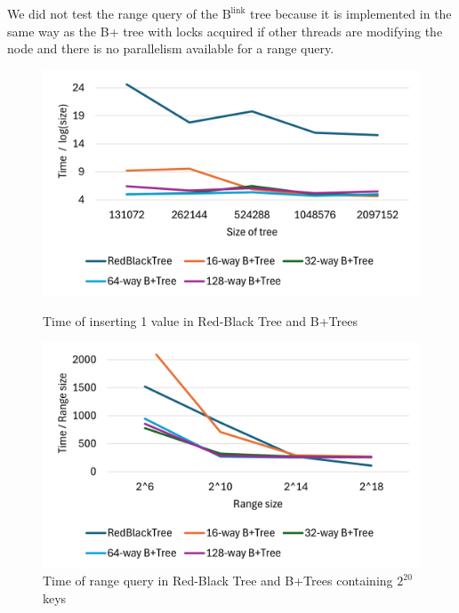 \documentclass[twoside,11pt,openright]{report}
\theoremstyle{definition}
\begin{document}
We did not test the range query of the $\text{B}^{\text{link}}$ tree because it is implemented in the same way as the B+ tree with locks acquired if other threads are modifying the node and there is no parallelism available for a range query.

\newpage
{}
\begin{figure}[htbp]
  \centering
  \begin{minipage}[b]{0.49\textwidth}
    \centering
    \includegraphics[width=\textwidth]{asset/insert.png}
    \captionsetup{width=0.9\textwidth}
    \caption{Time of inserting 1 value in Red-Black Tree and B+Trees}
    \label{fig:insert_BPlusTree}
  \end{minipage}
  \begin{minipage}[b]{0.49\textwidth}
    \centering
    \includegraphics[width=\textwidth]{asset/range_query.png}
    \captionsetup{width=0.9\textwidth}
    \caption{Time of range query in Red-Black Tree and B+Trees containing $2^{20}$ keys}
    \label{fig:rq_BPlusTree}
  \end{minipage}


\end{figure}
\end{document}
